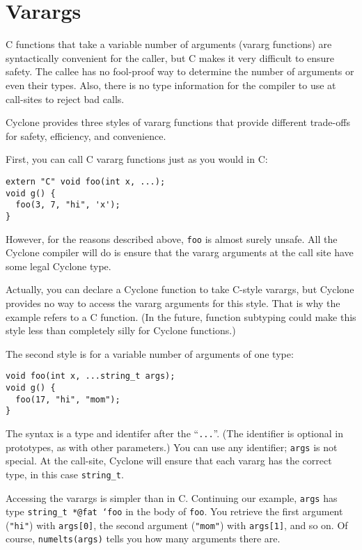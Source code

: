 \section{Varargs}
\label{sec:varargs}

C functions that take a variable number of arguments (vararg
functions) are syntactically convenient for the caller, but C makes it
very difficult to ensure safety.  The callee has no fool-proof way to
determine the number of arguments or even their types.  Also, there is
no type information for the compiler to use at call-sites to reject
bad calls.

Cyclone provides three styles of vararg functions that provide
different trade-offs for safety, efficiency, and convenience.

First, you can call C vararg functions just as you would in C:
\begin{verbatim}
extern "C" void foo(int x, ...);
void g() { 
  foo(3, 7, "hi", 'x');
}
\end{verbatim}
However, for the reasons described above, \texttt{foo} is almost
surely unsafe.  All the Cyclone compiler will do is ensure that the
vararg arguments at the call site have some legal Cyclone type.

Actually, you can declare a Cyclone function to take C-style varargs,
but Cyclone provides no way to access the vararg arguments for this
style.  That is why the example refers to a C function.  (In the
future, function subtyping could make this style less than completely
silly for Cyclone functions.)

The second style is for a variable number of arguments of one type:
\begin{verbatim}
void foo(int x, ...string_t args);
void g() {
  foo(17, "hi", "mom");
}
\end{verbatim}
The syntax is a type and identifer after the ``\texttt{...}''.  (The
identifier is optional in prototypes, as with other parameters.)  You
can use any identifier; \texttt{args} is not special.  At the
call-site, Cyclone will ensure that each vararg has the correct type,
in this case \texttt{string_t}.

Accessing the varargs is simpler than in C.  Continuing our example,
\texttt{args} has type \texttt{string_t *@fat `foo} in the body of
\texttt{foo}.  You retrieve the first argument (\texttt{"hi"}) with
\texttt{args[0]}, the second argument (\texttt{"mom"}) with
\texttt{args[1]}, and so on.  Of course, \texttt{numelts(args)} tells you
how many arguments there are.

